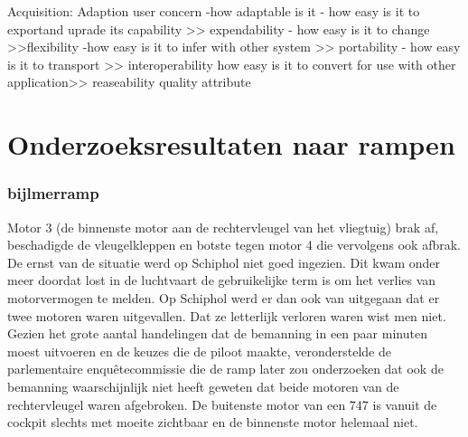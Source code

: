 Acquisition: Adaption
user concern
-how adaptable is it
- how easy is it to exportand uprade its capability >> expendability
- how easy is it to change >>flexibility
-how easy is it to infer with other system >> portability
- how easy is it to transport >> interoperability
how easy is it to convert for use with other application>> reaseability
quality attribute




\section{Onderzoeksresultaten naar rampen}




\subsubsection{bijlmerramp}
Motor 3 (de binnenste motor aan de rechtervleugel van het vliegtuig) brak af, beschadigde de vleugelkleppen en botste tegen motor 4 die vervolgens ook afbrak.
De ernst van de situatie werd op Schiphol niet goed ingezien. Dit kwam onder meer doordat lost in de luchtvaart de gebruikelijke term is om het verlies van motorvermogen te melden. Op Schiphol werd er dan ook van uitgegaan dat er twee motoren waren uitgevallen. Dat ze letterlijk verloren waren wist men niet. Gezien het grote aantal handelingen dat de bemanning in een paar minuten moest uitvoeren en de keuzes die de piloot maakte, veronderstelde de parlementaire enquêtecommissie die de ramp later zou onderzoeken dat ook de bemanning waarschijnlijk niet heeft geweten dat beide motoren van de rechtervleugel waren afgebroken. De buitenste motor van een 747 is vanuit de cockpit slechts met moeite zichtbaar en de binnenste motor helemaal niet.

